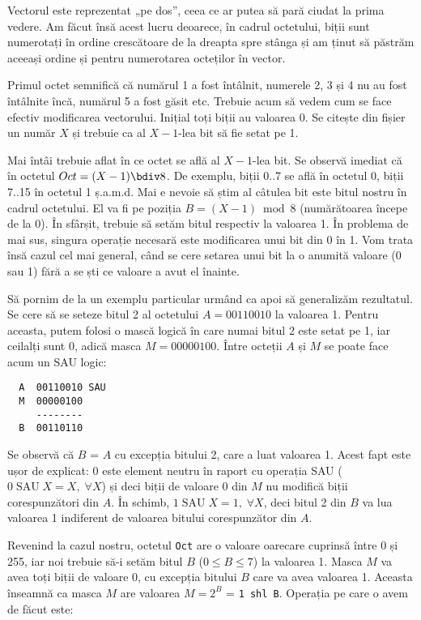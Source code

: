 Vectorul este reprezentat „pe dos”, ceea ce ar putea să pară ciudat la prima
vedere. Am făcut însă acest lucru deoarece, în cadrul octetului, biții sunt
numerotați în ordine crescătoare de la dreapta spre stânga și am ținut să
păstrăm aceeași ordine și pentru numerotarea octeților în vector.

Primul octet semnifică că numărul 1 a fost întâlnit, numerele 2, 3 și 4 nu au
fost întâlnite încă, numărul 5 a fost găsit etc. Trebuie acum să vedem cum se
face efectiv modificarea vectorului. Inițial toți biții au valoarea 0. Se
citește din fișier un număr $X$ și trebuie ca al $X-1$-lea bit să fie setat pe
1.

Mai întâi trebuie aflat în ce octet se află al $X-1$-lea bit. Se observă
imediat că în octetul $Oct = (X-1) \bdiv 8$. De exemplu, biții 0..7 se află în
octetul 0, biții 7..15 în octetul 1 ș.a.m.d. Mai e nevoie să știm al câtulea
bit este bitul nostru în cadrul octetului. El va fi pe poziția $B = (X-1)
\bmod 8$ (numărătoarea începe de la 0). În sfârșit, trebuie să setăm bitul
respectiv la valoarea 1. În problema de mai sus, singura operație necesară
este modificarea unui bit din 0 în 1. Vom trata însă cazul cel mai general,
când se cere setarea unui bit la o anumită valoare (0 sau 1) fără a se ști ce
valoare a avut el înainte.

Să pornim de la un exemplu particular urmând ca apoi să generalizăm
rezultatul. Se cere să se seteze bitul 2 al octetului $A = 00110010$ la
valoarea 1. Pentru aceasta, putem folosi o mască logică în care numai bitul 2
este setat pe 1, iar ceilalți sunt 0, adică masca $M = 00000100$. Între
octeții $A$ și $M$ se poate face acum un SAU logic:

\begin{verbatim}
  A  00110010 SAU
  M  00000100
     --------
  B  00110110
\end{verbatim}

Se observă că $B$ = $A$ cu excepția bitului 2, care a luat valoarea 1. Acest
fapt este ușor de explicat: 0 este element neutru în raport cu operația SAU
($0\; \mathrm{SAU}\; X = X,\; \forall X$) și deci biții de valoare 0 din $M$
nu modifică biții corespunzători din $A$. În schimb, $1\; \mathrm{SAU}\; X =
1,\; \forall X$, deci bitul 2 din $B$ va lua valoarea 1 indiferent de valoarea
bitului corespunzător din $A$.

Revenind la cazul nostru, octetul {\tt Oct} are o valoare oarecare cuprinsă
între 0 și 255, iar noi trebuie să-i setăm bitul $B$ ($0 \leq B \leq 7$) la
valoarea 1. Masca $M$ va avea toți biții de valoare 0, cu excepția bitului $B$
care va avea valoarea 1. Aceasta înseamnă ca masca $M$ are valoarea $M = 2^B$
= {\tt 1 shl B}. Operația pe care o avem de făcut este:

